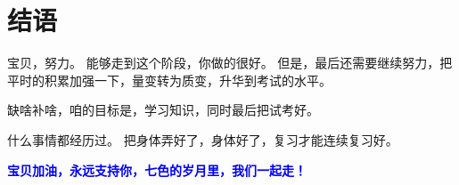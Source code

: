\documentclass[a4paper]{ctexart}
\begin{document}
\section{结语}
宝贝，努力。 能够走到这个阶段，你做的很好。 但是，最后还需要继续努力，把平时的积累加强一下，量变转为质变，升华到考试的水平。
\par
缺啥补啥，咱的目标是，学习知识，同时最后把试考好。
\par
什么事情都经历过。 把身体弄好了，身体好了，复习才能连续复习好。
\par
{}\heiti\textcolor{blue}{\textbf{宝贝加油，永远支持你，七色的岁月里，我们一起走！}}
\end{document}
